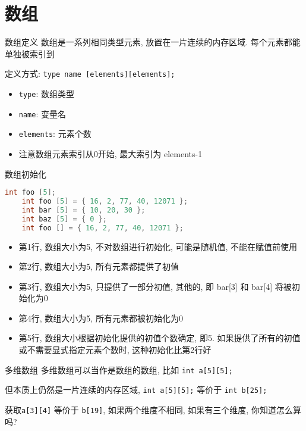 \section{数组}\label{sec:数组}

\begin{frame}[fragile]{数组定义}
    数组是一系列相同类型元素, 放置在一片连续的内存区域.
    每个元素都能单独被索引到

    定义方式: \texttt{type name [elements][elements];}

    \begin{itemize}[<+- | alert@+>]
        \item \texttt{type}: 数组类型
        \item \texttt{name}: 变量名
        \item \texttt{elements}: 元素个数
        \item 注意数组元素索引从0开始, 最大索引为 elements-1
    \end{itemize}
\end{frame}

\begin{frame}[fragile]{数组初始化}
    \begin{lstlisting}[language=c]
    int foo [5];
    int foo [5] = { 16, 2, 77, 40, 12071 };
    int bar [5] = { 10, 20, 30 };
    int baz [5] = { 0 };
    int foo [] = { 16, 2, 77, 40, 12071 };
    \end{lstlisting}

    \begin{itemize}[<+- | alert@+>]
        \item 第1行, 数组大小为5, 不对数组进行初始化, 可能是随机值, 不能在赋值前使用
        \item 第2行, 数组大小为5, 所有元素都提供了初值
        \item 第3行, 数组大小为5, 只提供了一部分初值, 其他的, 即 bar[3] 和 bar[4] 将被初始化为0
        \item 第4行, 数组大小为5, 所有元素都被初始化为0
        \item 第5行, 数组大小根据初始化提供的初值个数确定, 即5.
        如果提供了所有的初值或不需要显式指定元素个数时, 这种初始化比第2行好
    \end{itemize}
\end{frame}

\begin{frame}[fragile]{多维数组}
    多维数组可以当作是数组的数组, 比如 \texttt{int a[5][5];}

    但本质上仍然是一片连续的内存区域, \texttt{int a[5][5];} 等价于 \texttt{int b[25];}

    获取\texttt{a[3][4]} 等价于 \texttt{b[19]}, 如果两个维度不相同, 如果有三个维度, 你知道怎么算吗?
\end{frame}

